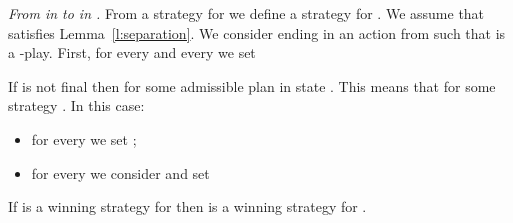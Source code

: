 \documentclass{llncs}
\begin{document}
\medskip
\noindent\textit{From  in  to  in .}
From a strategy  for  we define a
strategy  for . We assume that 
satisfies Lemma~\ref{l:separation}. We consider  ending in an
action from  such that  is a -play. First, for
every  and every  we set

If  is not final then 
for some admissible plan  in state . This means
that  for some strategy . In this case:
\begin{itemize}
\item for every  we set ;

\item for every  we consider
   and set
  
\end{itemize}

\medskip

\begin{lemma}\label{lemma:sigma prim to sigma}
  If  is a winning strategy for  then 
  is a winning strategy for .
\end{lemma}

\medskip
\end{document}
